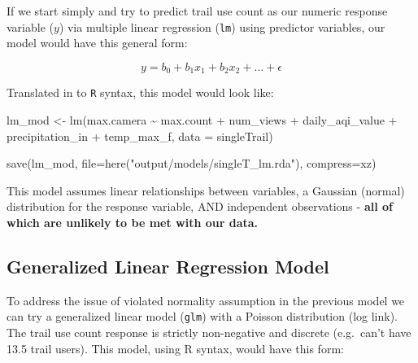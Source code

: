 \documentclass[
]{book}
\newenvironment{Shaded}{\begin{snugshade}}{\end{snugshade}}
\newcommand{\AttributeTok}[1]{\textcolor[rgb]{0.77,0.63,0.00}{#1}}
\newcommand{\FunctionTok}[1]{\textcolor[rgb]{0.00,0.00,0.00}{#1}}
\newcommand{\NormalTok}[1]{#1}
\newcommand{\OtherTok}[1]{\textcolor[rgb]{0.56,0.35,0.01}{#1}}
\newcommand{\SpecialCharTok}[1]{\textcolor[rgb]{0.00,0.00,0.00}{#1}}
\newcommand{\StringTok}[1]{\textcolor[rgb]{0.31,0.60,0.02}{#1}}
\begin{document}
If we start simply and try to predict trail use count as our numeric response variable (\(y\)) via multiple linear regression (\texttt{lm}) using predictor variables, our model would have this general form:

\[
y = b_0 + b_1x_1 + b_2x_2 + \dots + \epsilon
\]

Translated in to \texttt{R} syntax, this model would look like:

\begin{Shaded}
\begin{Highlighting}[]
\NormalTok{lm\_mod }\OtherTok{\textless{}{-}} \FunctionTok{lm}\NormalTok{(max.camera }\SpecialCharTok{\textasciitilde{}} 
\NormalTok{               max.count }\SpecialCharTok{+} 
\NormalTok{               num\_views }\SpecialCharTok{+}
\NormalTok{               daily\_aqi\_value }\SpecialCharTok{+} 
\NormalTok{               precipitation\_in }\SpecialCharTok{+} 
\NormalTok{               temp\_max\_f, }
             \AttributeTok{data =}\NormalTok{ singleTrail)}

\FunctionTok{save}\NormalTok{(lm\_mod, }
     \AttributeTok{file=}\FunctionTok{here}\NormalTok{(}\StringTok{"output/models/singleT\_lm.rda"}\NormalTok{), }
     \AttributeTok{compress=}\StringTok{\textquotesingle{}xz\textquotesingle{}}\NormalTok{)}
\end{Highlighting}
\end{Shaded}

This model assumes linear relationships between variables, a Gaussian (normal) distribution for the response variable, AND independent observations - \textbf{all of which are unlikely to be met with our data.}

\hypertarget{generalized-linear-regression-model-1}{%
\subsection{Generalized Linear Regression Model}\label{generalized-linear-regression-model-1}}

To address the issue of violated normality assumption in the previous model we can try a generalized linear model (\texttt{glm}) with a Poisson distribution (log link). The trail use count response is strictly non-negative and discrete (e.g.~can't have 13.5 trail users). This model, using R syntax, would have this form:
\end{document}
